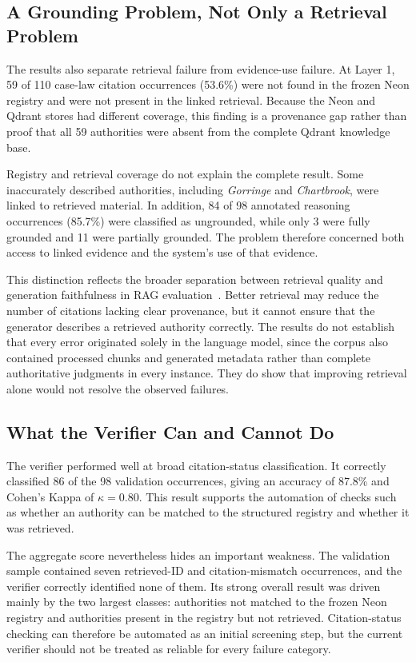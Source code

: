 \documentclass[conference]{IEEEtran}
\begin{document}
\subsection{A Grounding Problem, Not Only a Retrieval Problem}

The results also separate retrieval failure from evidence-use failure. At Layer 1, 59 of 110 case-law citation occurrences (53.6\%) were not found in the frozen Neon registry and were not present in the linked retrieval. Because the Neon and Qdrant stores had different coverage, this finding is a provenance gap rather than proof that all 59 authorities were absent from the complete Qdrant knowledge base.

Registry and retrieval coverage do not explain the complete result. Some inaccurately described authorities, including \textit{Gorringe} and \textit{Chartbrook}, were linked to retrieved material. In addition, 84 of 98 annotated reasoning occurrences (85.7\%) were classified as ungrounded, while only 3 were fully grounded and 11 were partially grounded. The problem therefore concerned both access to linked evidence and the system's use of that evidence.

This distinction reflects the broader separation between retrieval quality and generation faithfulness in RAG evaluation~\cite{ragas2024}. Better retrieval may reduce the number of citations lacking clear provenance, but it cannot ensure that the generator describes a retrieved authority correctly. The results do not establish that every error originated solely in the language model, since the corpus also contained processed chunks and generated metadata rather than complete authoritative judgments in every instance. They do show that improving retrieval alone would not resolve the observed failures.

\subsection{What the Verifier Can and Cannot Do}

The verifier performed well at broad citation-status classification. It correctly classified 86 of the 98 validation occurrences, giving an accuracy of 87.8\% and Cohen's Kappa of $\kappa = 0.80$. This result supports the automation of checks such as whether an authority can be matched to the structured registry and whether it was retrieved.

The aggregate score nevertheless hides an important weakness. The validation sample contained seven retrieved-ID and citation-mismatch occurrences, and the verifier correctly identified none of them. Its strong overall result was driven mainly by the two largest classes: authorities not matched to the frozen Neon registry and authorities present in the registry but not retrieved. Citation-status checking can therefore be automated as an initial screening step, but the current verifier should not be treated as reliable for every failure category.
\end{document}
